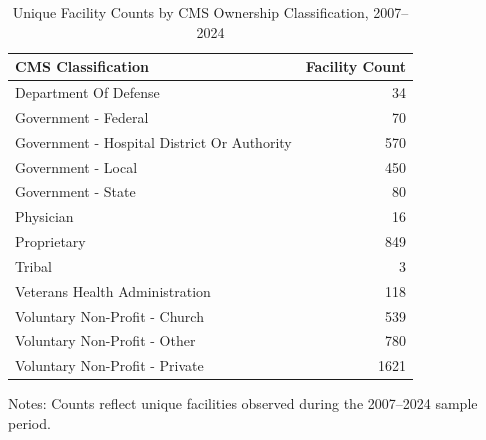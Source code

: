 \documentclass{article}
\begin{document}
\begin{table}[htbp]
\centering
\caption{Unique Facility Counts by CMS Ownership Classification, 2007--2024}
\label{tab:cms_counts}

\small

\begin{threeparttable}
\begin{tabular}{lr}
\toprule
CMS Classification & Facility Count \\
\midrule
Department Of Defense & 34 \\
Government - Federal & 70 \\
Government - Hospital District Or Authority & 570 \\
Government - Local & 450 \\
Government - State & 80 \\
Physician & 16 \\
Proprietary & 849 \\
Tribal & 3 \\
Veterans Health Administration & 118 \\
Voluntary Non-Profit - Church & 539 \\
Voluntary Non-Profit - Other & 780 \\
Voluntary Non-Profit - Private & 1621 \\
\bottomrule
\end{tabular}


\begin{tablenotes}[flushleft]
\footnotesize
\item Notes:
Counts reflect unique facilities observed during the
2007--2024 sample period.
\end{tablenotes}

\end{threeparttable}
\end{table}
\end{document}
